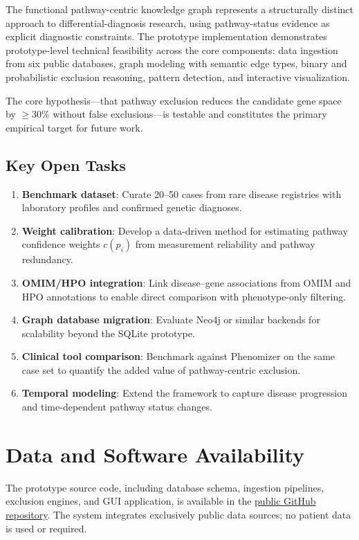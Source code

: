 \documentclass[12pt,a4paper]{article}
\begin{document}
The functional pathway-centric knowledge graph represents a structurally distinct approach to differential-diagnosis research, using pathway-status evidence as explicit diagnostic constraints. The prototype implementation demonstrates prototype-level technical feasibility across the core components: data ingestion from six public databases, graph modeling with semantic edge types, binary and probabilistic exclusion reasoning, pattern detection, and interactive visualization.

The core hypothesis---that pathway exclusion reduces the candidate gene space by $\geq 30\%$ without false exclusions---is testable and constitutes the primary empirical target for future work.

\subsection{Key Open Tasks}

\begin{enumerate}
    \item \textbf{Benchmark dataset}: Curate 20--50 cases from rare disease registries with laboratory profiles and confirmed genetic diagnoses.
    \item \textbf{Weight calibration}: Develop a data-driven method for estimating pathway confidence weights $c(p_i)$ from measurement reliability and pathway redundancy.
    \item \textbf{OMIM/HPO integration}: Link disease--gene associations from OMIM and HPO annotations to enable direct comparison with phenotype-only filtering.
    \item \textbf{Graph database migration}: Evaluate Neo4j or similar backends for scalability beyond the SQLite prototype.
    \item \textbf{Clinical tool comparison}: Benchmark against Phenomizer on the same case set to quantify the added value of pathway-centric exclusion.
    \item \textbf{Temporal modeling}: Extend the framework to capture disease progression and time-dependent pathway status changes.
\end{enumerate}

\section*{Data and Software Availability}

The prototype source code, including database schema, ingestion pipelines, exclusion engines, and GUI application, is available in the \href{https://github.com/um-bruch/system-medicine}{public GitHub repository}. The system integrates exclusively public data sources; no patient data is used or required.
\end{document}
